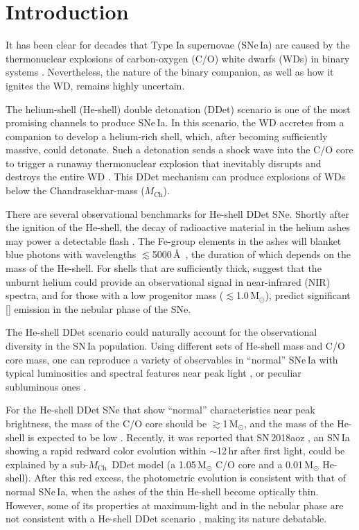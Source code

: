 \documentclass[twocolumn]{aastex631}
\newcommand{\Mch}{$M_\mathrm{Ch}$}
\newcommand{\Msun}{\mathrm{M_\odot}}
\begin{document}
\section{Introduction} \label{sec:intro}
It has been clear for decades that Type Ia supernovae (SNe\,Ia) are caused by the thermonuclear explosions of carbon-oxygen (C/O) white dwarfs (WDs) in binary systems \citep[see][for a review]{Maoz_2014}. Nevertheless, the nature of the binary companion, as well as how it ignites the WD, remains highly uncertain. 

The helium-shell (He-shell) double detonation (DDet) scenario is one of the most promising channels to produce SNe\,Ia. In this scenario, the WD accretes from a companion to develop a helium-rich shell, which, after becoming sufficiently massive, could detonate. Such a detonation sends a shock wave into the C/O core to trigger a runaway thermonuclear explosion that inevitably disrupts and destroys the entire WD \citep{Nomoto_1982a, Nomoto_1982b, Woosley_1986, Livne_1990, Woosley_1994, Livne_1995}. This DDet mechanism can produce explosions of WDs below the Chandrasekhar-mass (\Mch).

There are several observational benchmarks for He-shell DDet SNe. Shortly after the ignition of the He-shell, the decay of radioactive material in the helium ashes may power a detectable flash \citep{Woosley_1994,Fink_DD_2010,Kromer_DD_2010}. The Fe-group elements in the ashes will blanket blue photons with wavelengths $\lesssim$5000\,\AA\ \citep{Kromer_DD_2010}, the duration of which depends on the mass of the He-shell. For shells that are sufficiently thick, \citet{Boyle2017_Helium} suggest that the unburnt helium could provide an observational signal in near-infrared (NIR) spectra, and for those with a low progenitor mass ($\lesssim$1.0\,$\Msun$), \citet{polin_nebular_2021} predict significant [] emission in the nebular phase of the SNe.

The He-shell DDet scenario could naturally account for the observational diversity in the SN\,Ia population. Using different sets of He-shell mass and C/O core mass, one can reproduce a variety of observables in ``normal'' SNe\,Ia with typical luminosities and spectral features near peak light \citep[e.g.,][]{Townsley_2019,Shen_2D_2021,Magee_2021}, or peculiar subluminous ones \citep[e.g.,][]{polin_observational_2019}. 

For the He-shell DDet SNe that show ``normal'' characteristics near peak brightness, the mass of the C/O core should be $\gtrsim$1\,$\mathrm{M_\odot}$, and the mass of the He-shell is expected to be low \citep[$\lesssim$0.03\,$\mathrm{M_\odot}$;][]{polin_observational_2019,Magee_2021,Shen_2D_2021}. Recently, it was reported that SN\,2018aoz \citep{Ni_2022}, an SN\,Ia showing a rapid redward color evolution within $\sim$12\,hr after first light, could be explained by a sub-\Mch\ DDet model (a 1.05\,$\mathrm{M_\odot}$ C/O core and a 0.01\,$\mathrm{M_\odot}$ He-shell). After this red excess, the photometric evolution is consistent with that of normal SNe\,Ia, when the ashes of the thin He-shell become optically thin. However, some of its properties at maximum-light and in the nebular phase are not consistent with a He-shell DDet scenario \citep{Ni_2022b}, making its nature debatable. 
\end{document}
